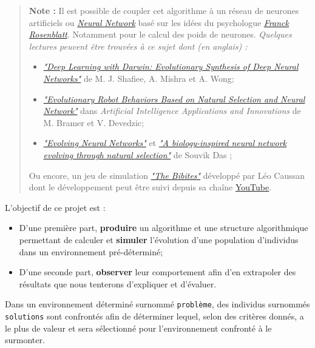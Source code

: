 \begin{quote}
\textbf{Note :} Il est possible de coupler cet algorithme à un réseau de
neurones artificiels ou
\href{https://fr.wikipedia.org/wiki/R\%C3\%A9seau_de_neurones_artificiels}{\emph{Neural
Network}} basé sur les idées du psychologue
\href{https://fr.wikipedia.org/wiki/Frank_Rosenblatt}{\emph{Franck
Rosenblatt}}. Notamment pour le calcul des poids de neurones.
\emph{Quelques lectures peuvent être trouvées à ce sujet dont (en
anglais) :}

\begin{itemize}
\tightlist
\item
  \href{https://arxiv.org/pdf/1606.04393.pdf}{\emph{"Deep Learning with
  Darwin: Evolutionary Synthesis of Deep Neural Networks"}} de M. J.
  Shafiee, A. Mishra et A. Wong;
\item
  \href{https://link.springer.com/chapter/10.1007/1-4020-8151-0_6}{\emph{"Evolutionary
  Robot Behaviors Based on Natural Selection and Neural Network"}} dans
  \emph{Artificial Intelligence Applications and Innovations} de M.
  Bramer et V. Devedzic;
\item
  \href{https://home.fnal.gov/~souvik/Brain/index.html}{\emph{"Evolving
  Neural Networks"}} et
  \href{https://home.fnal.gov/~souvik/Brain/BrainInWorld.pdf}{\emph{"A
  biology-inspired neural network evolving through natural selection"}}
  de Souvik Das ;
\end{itemize}

Ou encore, un jeu de simulation
\href{https://leocaussan.itch.io/the-bibites}{\emph{"The Bibites"}}
développé par Léo Caussan dont le développement peut être suivi depuis
sa chaîne
\href{https://www.youtube.com/channel/UCjJEUMnBFHOP2zpBc7vCnsA}{YouTube}.
\end{quote}

L'objectif de ce projet est :

\begin{itemize}
\tightlist
\item
  D'une première part, \textbf{produire} un algorithme et une structure
  algorithmique permettant de calculer et \textbf{simuler} l'évolution
  d'une population d'individus dans un environnement pré-déterminé;
\item
  D'une seconde part, \textbf{observer} leur comportement afin d'en
  extrapoler des résultats que nous tenterons d'expliquer et d'évaluer.
\end{itemize}

Dans un environnement déterminé surnommé \texttt{problème}, des
individus surnommés \texttt{solutions} sont confrontés afin de
déterminer lequel, selon des critères donnés, a le plus de valeur et
sera sélectionné pour l'environnement confronté à le surmonter.

